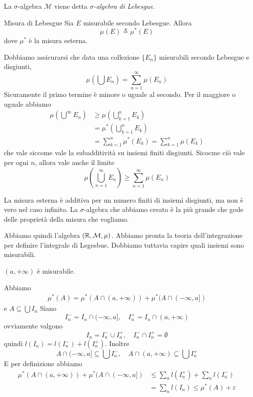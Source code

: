 \documentclass[a4paper]{article}
\begin{document}
La \(\sigma\)-algebra \(\mathcal{M}\) viene detta \emph{\(\sigma\)-algebra di Lebesgue}.

\begin{snippetdefinition}{Misura di Lebesgue}
    Sia \(E\) misurabile secondo Lebesgue.
    Allora
    \[
        \mu(E) \triangleq \mu^*(E)
    \]
    dove \(\mu^*\) è la misura esterna.
\end{snippetdefinition}

Dobbiamo assicurarsi che data una collezione \(\{E_n\}\) misurabili secondo Lebesgue e disgiunti,
\[
    \mu\left(\bigcup E_n\right) = \sum_{n=1}^\infty \mu(E_n)
\]
Sicuramente il primo termine è minore o uguale al secondo.
Per il maggiore o uguale abbiamo
\begin{align*}
    \mu\left(\bigcup^\infty E_n\right) &\geq \mu\left(\bigcup_{k=1}^n E_k\right) \\
    &= \mu^*\left(\bigcup_{k=1}^n E_k\right) \\
    &= \sum_{k=1}^n \mu^*(E_k) = \sum_{k=1}^n \mu(E_k)
\end{align*}
che vale siccome vale la subadditività su insiemi finiti disgiunti.
Sicocme ciò vale per ogni \(n\), allora vale anche il limite
\[
    \mu\left(
        \bigcup_{n=1}^\infty E_n
    \right)
     \geq \sum_{n=1}^\infty \mu(E_n)
\]

La misura esterna è additiva per un numero finiti di insiemi disgiunti, ma non è vero nel caso infinito.
La \(\sigma\)-algebra che abbiamo creato è la più grande che gode delle proprietà della misura che vogliamo.

Abbiamo quindi l'algebra \((\mathbb{R}, \mathcal{M}, \mu)\). Abbiamo pronta la teoria dell'integrazione
per definire l'integrale di Legesbue. Dobbiamo tuttavia capire quali insiemi sono misurabili.

\begin{snippetproposition}{}
    \((a, +\infty)\) è misurabile.
\end{snippetproposition}

\begin{snippetproof}{}
    Abbiamo
    \begin{align*}
        \mu^*(A) = \mu^*(A \cap (a, +\infty)) + \mu^*(A \cap (-\infty, a])
    \end{align*}
    e \(A \subseteq \bigcup I_n\)
    Siano \[
        I_n^- = I_n \cap (-\infty, a], \quad I_n^+ = I_n \cap (a, +\infty)
    \]
    ovviamente valgono
    \[
        I_n = I_n^- \cup I_n^+, \quad I_n^- \cap I_n^+ = \emptyset
    \]
    quindi
    \(l(I_n) = l(I_n^-) + l(I_n^+)\). Inoltre
    \[
        A \cap (-\infty, a] \subseteq \bigcup I_n^-, \quad
        A \cap (a, +\infty) \subseteq \bigcup I_n^+
    \]
    E per definizione abbiamo
    \begin{align*}
        \mu^*(A \cap (a, +\infty)) + \mu^*(A \cap (-\infty, a])
        &\leq \sum_n l(I_n^+) + \sum_n l(I_n^-) \\
        &= \sum_n l(I_n) \leq \mu^*(A) + \varepsilon
    \end{align*}
\end{snippetproof}
\end{document}
